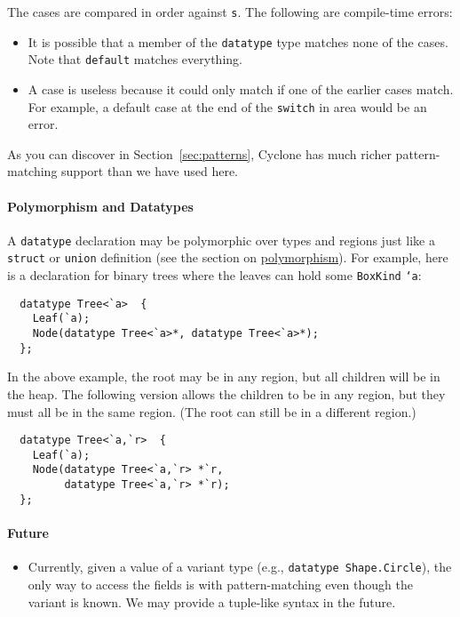 The cases are compared in order against \texttt{s}.  The following are
compile-time errors:
\begin{itemize}
\item It is possible that a member of the \texttt{datatype} type matches
  none of the cases.  Note that \texttt{default} matches everything.
\item A case is useless because it could only match if one of the
  earlier cases match.  For example, a default case at the end of the
  \texttt{switch} in area would be an error.
\end{itemize}

As you can discover in Section~\ref{sec:patterns}, Cyclone has much
richer pattern-matching support than we have used here.

\paragraph{Polymorphism and Datatypes} A \texttt{datatype} declaration may be
polymorphic over types and regions just like a \texttt{struct}
or \texttt{union} definition (see the section on
\hyperlink{polymorphism}{polymorphism}).  For example, here is a
declaration for binary trees where the leaves can hold some
\texttt{BoxKind} \texttt{`a}:
\begin{verbatim}
  datatype Tree<`a>  {
    Leaf(`a);
    Node(datatype Tree<`a>*, datatype Tree<`a>*);
  };
\end{verbatim}

In the above example, the root may be in any region, but all children
will be in the heap.  The following version allows the children to be in any
region, but they must all be in the same region.  (The root can still
be in a different region.)

\begin{verbatim}
  datatype Tree<`a,`r>  {
    Leaf(`a);
    Node(datatype Tree<`a,`r> *`r, 
         datatype Tree<`a,`r> *`r);
  };
\end{verbatim}

\paragraph{Future}
\begin{itemize}
\item Currently, given a value of a variant type (e.g.,
  \texttt{datatype Shape.Circle}), the only way to access the fields is
  with pattern-matching even though the variant is known.  We may
  provide a tuple-like syntax in the future.
\end{itemize}

